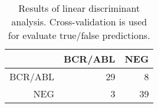 \begin{table}[ht]
\centering
\begin{tabular}{rrr}
  \hline
 & BCR/ABL & NEG \\ 
  \hline
BCR/ABL &  29 &   8 \\ 
  NEG &   3 &  39 \\ 
   \hline
\end{tabular}
\caption{Results of linear discriminant analysis. Cross-validation is used for evaluate true/false predictions.} 
\label{tab:lda}
\end{table}
